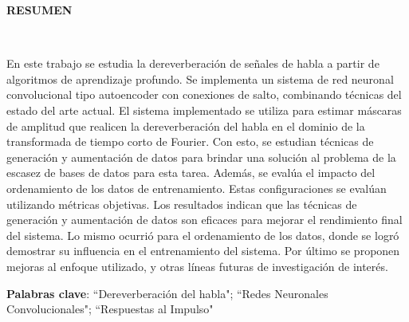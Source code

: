 
\renewenvironment{abstract}
 {\par\noindent\textbf{\abstractname}\ }

\renewcommand{\abstractname}{\normalfont\fontsize{16}{18}\bfseries RESUMEN\vspace{14pt}}

\begin{abstract}

En este trabajo se estudia la dereverberación de señales de habla a partir de algoritmos de aprendizaje profundo. Se implementa un sistema de red neuronal convolucional tipo autoencoder con conexiones de salto, combinando técnicas del estado del arte actual. El sistema implementado se utiliza para estimar máscaras de amplitud que realicen la dereverberación del habla en el dominio de la transformada de tiempo corto de Fourier. Con esto, se estudian técnicas de generación y aumentación de datos para brindar una solución al problema de la escasez de bases de datos para esta tarea. Además, se evalúa el impacto del ordenamiento de los datos de entrenamiento. Estas configuraciones se evalúan utilizando métricas objetivas. Los resultados indican que las técnicas de generación y aumentación de datos son eficaces para mejorar el rendimiento final del sistema. Lo mismo ocurrió para el ordenamiento de los datos, donde se logró demostrar su influencia en el entrenamiento del sistema. Por último se proponen mejoras al enfoque utilizado, y otras líneas futuras de investigación de interés.

\vspace{14pt}

\textbf{Palabras clave}: ``Dereverberación del habla"; ``Redes Neuronales Convolucionales"; ``Respuestas al Impulso"
\end{abstract}

\newpage

